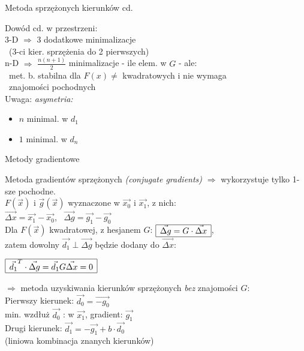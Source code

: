   \begin{frame}{Metoda sprzężonych kierunków cd. }

   \begin{block}{Dowód cd.}
	  w przestrzeni:
	  \smallskip
	  \\3-D $\Rightarrow$ 3 dodatkowe minimalizacje
	  \\ \ (3-ci kier. sprzężenia do 2 pierwszych)
	  \\n-D $\Rightarrow$ $\frac{n(n+1)}{2}$ minimalizacje - ile elem. w $G$ - ale:
	  \\ \ met. b. stabilna dla $F(x) \neq$ kwadratowych i nie wymaga
	  \\ \ znajomości pochodnych
	  \medskip
	  \\Uwaga: \emph{asymetria:}
	  \begin{itemize}
	  	  \item $n$ minimal. w $d_1$
	  	  \item $1$ minimal. w $d_n$
	  \end{itemize}
 	\end{block}

  \end{frame}

  \begin{frame}{Metody gradientowe}

 	\begin{block}{Metoda gradientów sprzężonych \emph{(conjugate gradients)}}
 	   $\Rightarrow$ wykorzystuje tylko 1-sze pochodne.
 	   \medskip
 	   \\ $F(\vec{x})$ i $\vec{g}(\vec{x})$ wyznaczone w $\vec{x_0}$ i $\vec{x_1}$, z nich:
 	   \smallskip
 	   \\ $\vec{\Delta x} = \vec{x_1} - \vec{x_0}$, \ $\vec{\Delta g} = \vec{g_1} - \vec{g_0}$
 	   \smallskip
 	   \\ Dla $F(\vec{x})$ kwadratowej, z hesjanem $G$:
 	   $\begin{array}{|c|}
 	   	  \hline
 	   	  \vec{\Delta g} = G \cdot \vec{\Delta x}
 	   	  \\ \hline
 	   \end{array}$,
 	   \\zatem dowolny $\vec{d_1} \perp \vec{\Delta g}$ będzie dodany do $\vec{\Delta x}$:
 	   \begin{center}
 	      $\begin{array}{|c|}
 	   	    \hline
 	   	    \vec{d_1}^T \cdot \vec{\Delta g} = \vec{d_1} G \vec{\Delta x} = 0
 	   	    \\ \hline
 	      \end{array}$
 	   \end{center}
 	   \smallskip
 	   $\Rightarrow$ metoda uzyskiwania kierunków sprzężonych \emph{bez} znajomości $G$:
 	   \\Pierwszy kierunek: $\vec{d_0} = \vec{-g_0}$
 	   \\min. wzdłuż $\vec{d_0}$ : w $\vec{x_1}$, gradient:  $\vec{g_1}$
 	   \\Drugi kierunek: $\vec{d_1} = -\vec{g_1} + b \cdot \vec{d_0}$
 	   \\(liniowa kombinacja znanych kierunków)
 	\end{block}

  \end{frame}

